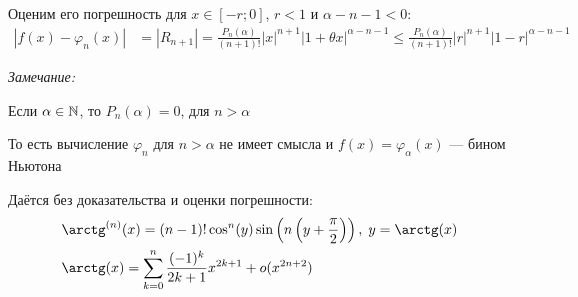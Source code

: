 \documentclass{article}
\begin{document}
Оценим его погрешность для $x\in[-r;0]$, $r<1$ и $\alpha-n-1< 0$:
\begin{align*}
	|f(x)-\varphi_{n}(x)| & =|R_{n+1}|=\frac{P_{n}(\alpha)}{(n+1)!}|x|^{n+1}|1+\theta x|^{\alpha-n-1}
	\leq\frac{P_{n}(\alpha)}{(n+1)!}|r|^{n+1}|1-r|^{\alpha-n-1}
\end{align*}

{\it Замечание:}

Если $\alpha\in\mathbb{N}$, то $P_{n}(\alpha)=0$, для $n>\alpha$

То есть вычисление $\varphi_{n}$ для $n>\alpha$ не имеет смысла и $f(x)=\varphi_{\alpha}(x)$ --- бином Ньютона


Даётся без доказательства и оценки погрешности:
\begin{align*}
	 & \arctg^{(n)} (x) = (n-1)! \cos^n (y)\sin\left(n\left(y+\frac{\pi}{2}\right)\right),\;y = \arctg(x) \\
	 & \arctg(x)=\sum_{k=0}^{n}\frac{(-1)^{k}}{2k+1}x^{2k+1}+o(x^{2n+2})
\end{align*}
\end{document}
